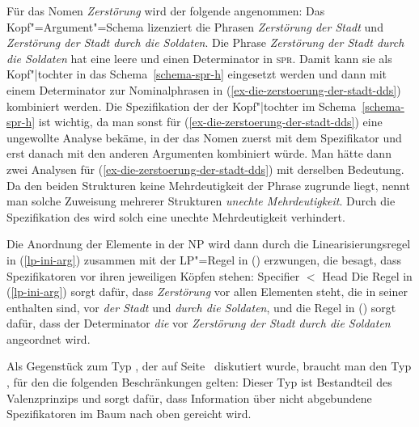 \noindent
Für das Nomen \emph{Zerstörung} wird der folgende \catw angenommen:
\ea
{}
\z
Das Kopf"=Argument"=Schema lizenziert die Phrasen  \emph{Zerstörung der Stadt}
und  \emph{Zerstörung der Stadt durch die Soldaten}. Die Phrase  \emph{Zerstörung der Stadt durch
  die Soldaten} hat eine leere \compsl und einen Determinator in \textsc{spr}. Damit kann sie als
Kopf"|tochter in das Schema~\ref{schema-spr-h} eingesetzt werden und dann mit einem Determinator zur
Nominalphrasen in (\ref{ex-die-zerstoerung-der-stadt-dds}) kombiniert werden. Die Spezifikation der \compsl der Kopf"|tochter
im Schema~\ref{schema-spr-h} ist wichtig, da man sonst für (\ref{ex-die-zerstoerung-der-stadt-dds})
eine ungewollte Analyse bekäme, in der das Nomen zuerst mit dem Spezifikator und erst danach
mit den anderen Argumenten kombiniert würde. Man hätte dann zwei Analysen für
(\ref{ex-die-zerstoerung-der-stadt-dds}) mit derselben Bedeutung. Da den beiden Strukturen keine
Mehrdeutigkeit der Phrase zugrunde liegt, nennt man solche Zuweisung mehrerer Strukturen
\emph{unechte Mehrdeutigkeit}. Durch die Spezifikation des \compswes wird
solch eine unechte Mehrdeutigkeit verhindert.

Die Anordnung der Elemente in der NP wird dann durch die Linearisierungsregel in (\ref{lp-ini-arg})
zusammen mit der LP"=Regel in () erzwungen, die besagt, dass Spezifikatoren vor ihren
jeweiligen Köpfen stehen:
\ea
Specifier $<$ Head
\z
Die Regel in (\ref{lp-ini-arg}) sorgt dafür, dass \emph{Zerstörung} vor allen Elementen steht, die in seiner
\compsl enthalten sind, \dash vor \emph{der Stadt} und \emph{durch die Soldaten}, und die Regel in
() sorgt dafür, dass der Determinator \emph{die} vor \emph{Zerstörung der Stadt durch die
Soldaten} angeordnet wird.

Als Gegenstück zum Typ , der auf Seite~\pageref{def-head-non-arg-phrase}
diskutiert wurde, braucht man den Typ , für den die folgenden Beschränkungen gelten:
\ea
\label{def-head-non-spr-phrase}
 \impl
{}
\z
Dieser Typ ist Bestandteil des Valenzprinzips und sorgt dafür,
dass Information über nicht abgebundene Spezifikatoren im Baum nach oben gereicht wird.

